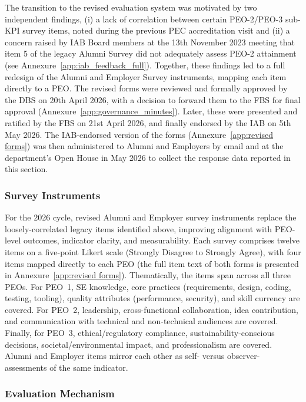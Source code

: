 The transition to the revised evaluation system was motivated by two independent findings, (i) a lack of correlation between certain PEO-2/PEO-3 sub-KPI survey items, noted during the previous PEC accreditation visit and (ii) a concern raised by IAB Board members at the 13th November 2023 meeting that item 5 of the legacy Alumni Survey did not adequately assess PEO-2 attainment (see Annexure~\ref{app:iab_feedback_full}). Together, these findings led to a full redesign of the Alumni and Employer Survey instruments, mapping each item directly to a PEO. The revised forms were reviewed and formally approved by the DBS on 20th April 2026, with a decision to forward them to the FBS for final approval (Annexure~\ref{app:governance_minutes}). Later, these were presented and ratified by the FBS on 21st April 2026, and finally endorsed by the IAB on 5th May 2026. The IAB-endorsed version of the forms (Annexure~\ref{app:revised forms}) was then administered to Alumni and Employers by email and at the department's Open House in May 2026 to collect the response data reported in this section.

\subsubsection{Survey Instruments}

For the 2026 cycle, revised Alumni and Employer survey instruments replace the loosely-correlated legacy items identified above, improving alignment with PEO-level outcomes, indicator clarity, and measurability. Each survey comprises twelve items on a five-point Likert scale (Strongly Disagree to Strongly Agree), with four items mapped directly to each PEO (the full item text of both forms is presented in Annexure~\ref{app:revised forms}). Thematically, the items span across all three PEOs. For PEO~1, SE knowledge, core practices (requirements, design, coding, testing, tooling), quality attributes (performance, security), and skill currency are covered. For PEO~2, leadership, cross-functional collaboration, idea contribution, and communication with technical and non-technical audiences are covered. Finally, for PEO~3, ethical/regulatory compliance, sustainability-conscious decisions, societal/environmental impact, and professionalism are covered. Alumni and Employer items mirror each other as self- versus observer-assessments of the same indicator.

\subsubsection{Evaluation Mechanism}

